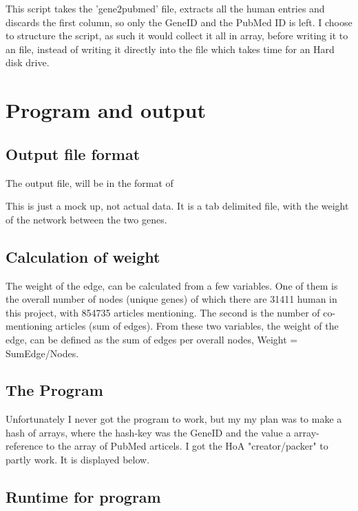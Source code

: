 

This script takes the 'gene2pubmed' file, extracts all the human entries and discards the first column, so only the GeneID and the PubMed ID is left. I choose to structure the script, as such it would collect it all in array, before writing it to an file, instead of writing it directly into the file which takes time for an Hard disk drive. 

\section*{Program and output}

\subsection*{Output file format}
The output file, will be in the format of 



This is just a mock up, not actual data. It is a tab delimited file, with the weight of the network between the two genes. 

\subsection*{Calculation of weight}
The weight of the edge, can be calculated from a few variables. One of them is the overall number of nodes (unique genes) of which there are 31411 human in this project, with 854735 articles mentioning. The second is the number of co-mentioning articles (sum of edges). From these two variables, the weight of the edge, can be defined as the sum of edges per overall nodes, Weight = SumEdge/Nodes. 

\newpage

\subsection*{The Program}
Unfortunately I never got the program to work, but my my plan was to make a hash of arrays, where the hash-key was the GeneID and the value a array-reference to the array of PubMed articels. I got the HoA "creator/packer" to partly work. It is displayed below.





\subsection*{Runtime for program}

